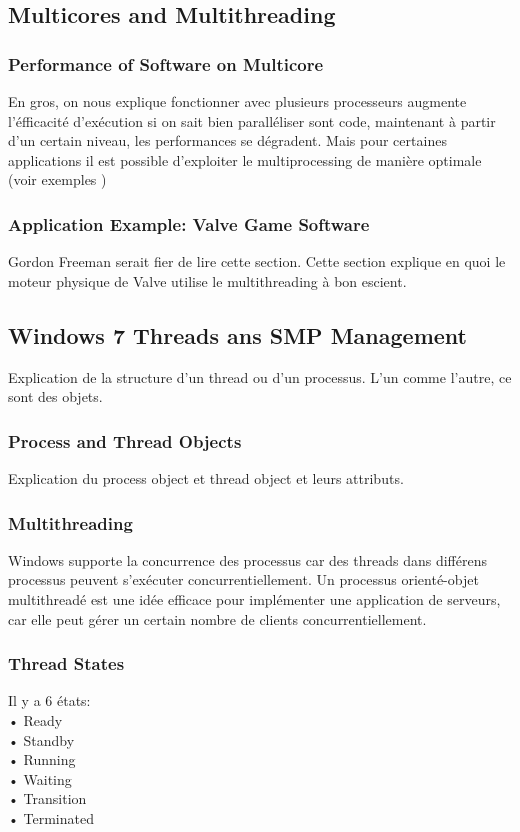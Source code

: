 \subsection{Multicores and Multithreading}
\subsubsection{Performance of Software on Multicore}
En gros, on nous explique fonctionner avec plusieurs processeurs augmente l'éfficacité d'exécution si on sait bien paralléliser sont code, maintenant à partir d'un certain niveau, les performances se dégradent. Mais pour certaines applications il est possible d'exploiter le multiprocessing de manière optimale (voir exemples \cite[p.~193]{stallings})
\subsubsection{Application Example: Valve Game Software}
Gordon Freeman serait fier de lire cette section. Cette section explique en quoi le moteur physique de Valve utilise le multithreading à bon escient.
\subsection{Windows 7 Threads ans SMP Management}
Explication de la structure d'un thread ou d'un processus. L'un comme l'autre, ce sont des objets.
\subsubsection{Process and Thread Objects}
Explication du process object et thread object et leurs attributs.
\subsubsection{Multithreading}
Windows supporte la concurrence des processus car des threads dans différens processus peuvent s'exécuter concurrentiellement. Un processus orienté-objet multithreadé est une idée efficace pour implémenter une application de serveurs, car elle peut gérer un certain nombre de clients concurrentiellement.
\subsubsection{Thread States}
Il y a 6 états: \\
• Ready \\
• Standby \\
• Running \\
• Waiting \\
• Transition \\
• Terminated \\
